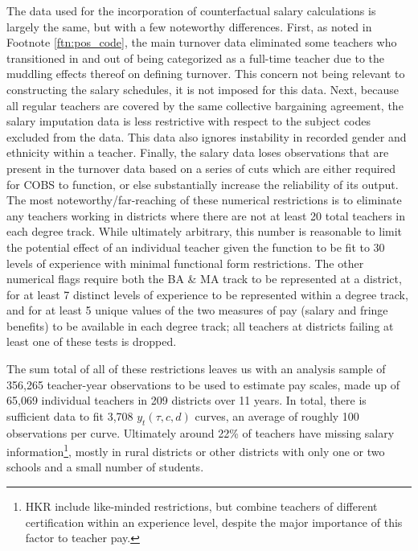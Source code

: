 The data used for the incorporation of counterfactual salary
calculations is largely the same, but with a few noteworthy differences.
First, as noted in Footnote \ref{ftn:pos_code}, the main turnover data
eliminated some teachers who transitioned in and out of being
categorized as a full-time teacher due to the muddling effects thereof
on defining turnover. This concern not being relevant to constructing
the salary schedules, it is not imposed for this data. Next, because all
regular teachers are covered by the same collective bargaining
agreement, the salary imputation data is less restrictive with respect
to the subject codes excluded from the data. This data also ignores
instability in recorded gender and ethnicity within a teacher. Finally,
the salary data loses observations that are present in the turnover data
based on a series of cuts which are either required for COBS to
function, or else substantially increase the reliability of its output.
The most noteworthy/far-reaching of these numerical restrictions is to
eliminate any teachers working in districts where there are not at least
20 total teachers in each degree track. While ultimately arbitrary, this
number is reasonable to limit the potential effect of an individual
teacher given the function to be fit to 30 levels of experience with
minimal functional form restrictions. The other numerical flags require
both the BA \& MA track to be represented at a district, for at least 7
distinct levels of experience to be represented within a degree track,
and for at least 5 unique values of the two measures of pay (salary and
fringe benefits) to be available in each degree track; all teachers at
districts failing at least one of these tests is dropped.

The sum total of all of these restrictions leaves us with an analysis
sample of 356,265 teacher-year observations to be used to estimate pay
scales, made up of 65,069 individual teachers in 209 districts over 11
years. In total, there is sufficient data to fit 3,708
\(y_t(\tau, c, d)\) curves, an average of roughly 100 observations per
curve. Ultimately around 22\% of teachers have missing salary
information\footnote{HKR include like-minded restrictions, but combine
  teachers of different certification within an experience level,
  despite the major importance of this factor to teacher pay.}, mostly
in rural districts or other districts with only one or two schools and a
small number of students.

